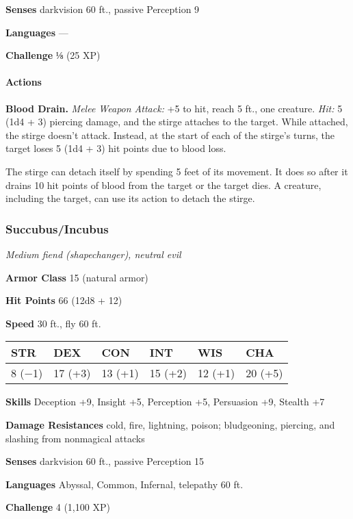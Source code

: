 \documentclass[
]{article}
\begin{document}
\textbf{Senses} darkvision 60 ft., passive Perception 9

\textbf{Languages} ---

\textbf{Challenge} ⅛ (25 XP)

\hypertarget{actions-13}{%
\paragraph{Actions}\label{actions-13}}

\textbf{Blood Drain.} \emph{Melee Weapon Attack:} +5 to hit, reach 5
ft., one creature. \emph{Hit:} 5 (1d4 + 3) piercing damage, and the
stirge attaches to the target. While attached, the stirge doesn't
attack. Instead, at the start of each of the stirge's turns, the target
loses 5 (1d4 + 3) hit points due to blood loss.

The stirge can detach itself by spending 5 feet of its movement. It does
so after it drains 10 hit points of blood from the target or the target
dies. A creature, including the target, can use its action to detach the
stirge.

\hypertarget{succubusincubus}{%
\subsubsection{Succubus/Incubus}\label{succubusincubus}}

\emph{Medium fiend (shapechanger), neutral evil}

\textbf{Armor Class} 15 (natural armor)

\textbf{Hit Points} 66 (12d8 + 12)

\textbf{Speed} 30 ft., fly 60 ft.

\begin{longtable}[]{@{}llllll@{}}
\toprule
STR & DEX & CON & INT & WIS & CHA\tabularnewline
\midrule
\endhead
8 (−1) & 17 (+3) & 13 (+1) & 15 (+2) & 12 (+1) & 20 (+5)\tabularnewline
\bottomrule
\end{longtable}

\textbf{Skills} Deception +9, Insight +5, Perception +5, Persuasion +9,
Stealth +7

\textbf{Damage Resistances} cold, fire, lightning, poison; bludgeoning,
piercing, and slashing from nonmagical attacks

\textbf{Senses} darkvision 60 ft., passive Perception 15

\textbf{Languages} Abyssal, Common, Infernal, telepathy 60 ft.

\textbf{Challenge} 4 (1,100 XP)
\end{document}
